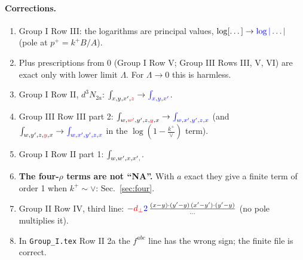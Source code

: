 \documentclass[10pt]{article}
\numberwithin{equation}{section}
\newcommand{\new}[1]{{\color{blue}#1}}
\newcommand{\old}[1]{{\color{red}#1}}
\begin{document}
\paragraph{Corrections.}
\begin{enumerate}
\item[\textbf{F1}] Group I Row III: the logarithms are principal values, $\log[\dots]\to\new{\log|\dots|}$ (pole at $p^+=k^+B/A$).
\item[\textbf{F2}] Plus prescriptions from $0$ (Group I Row V; Group III Rows III, V, VI) are exact only with lower limit $\Lambda$. For $\Lambda\to0$ this is harmless.
\item[\textbf{F3}] Group I Row II, $d^3N_{2a}$: $\int_{x,y,x',\old{z}}\to\new{\int_{x,y,x'}}$.
\item[\textbf{F4}] Group III Row III part 2: $\int_{w,\old{w'},y',z,\old{y},x}\to\new{\int_{w,x',y',z,x}}$ (and $\int_{w,y',z,\old{y},x}\to\new{\int_{w,x',y',z,x}}$ in the $\log(1-\frac{k^+}{\vee})$ term).
\item[\textbf{F5}] Group I Row II part 1: $\int_{w,w',x,x'\old{,}}$.
\item[\textbf{F6}] \new{\textbf{The four-$\rho$ terms are not ``NA''.} With $a$ exact they give a finite term of order 1 when $k^+\sim\vee$: Sec.~\ref{sec:four}.}
\item[\textbf{F7}] Group II Row IV, third line: $-\old{d_\perp}\new{2}\,\frac{(x-y)\cdot(y'-y)\,(x'-y')\cdot(y'-y)}{\dots}$ (no pole multiplies it).
\item[\textbf{R}] In \texttt{Group\_I.tex} Row II 2a the $f^{abc}$ line has the wrong sign; the finite file is correct.
\end{enumerate}

\end{document}
